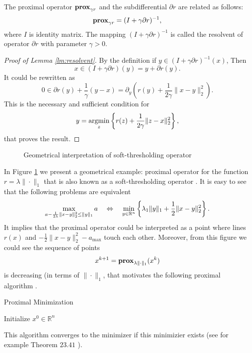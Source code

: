 {\begin{lemma}[Resolvent]\label{lm:resolvent}
    The proximal operator $\mathbf{prox}_{\gamma r}$ and the subdifferential $\partial r$ are related as follows:
    \begin{equation}\label{eq:resolvent}
        \mathbf{prox}_{\gamma r} = (I+\gamma\partial r)^{-1}, 
    \end{equation}
    where $I$ is identity matrix.
    The mapping $(I+\gamma\partial r)^{-1}$ is called the resolvent of operator $\partial r$ with parameter $\gamma>0$.
\end{lemma}
\begin{proof}[Proof of Lemma \ref{lm:resolvent}]
By the definition if $y\in (I+\gamma\partial r)^{-1}(x)$, Then
$$
x\in (I+\gamma\partial r)(y) = y + \partial r(y).
$$
It could be rewritten as
$$
0\in \partial r(y) + \frac{1}{\gamma}(y-x) = \partial_y \left(r(y) + \frac{1}{2\gamma}\|x-y\|_2^2\right).
$$
This is the necessary and sufficient condition for 
$$
y = \operatorname*{argmin}_z\left\{r(z) + \frac{1}{2\gamma}\|z-x\|_2^2\right\},
$$
that proves the result.
\end{proof}
}
\begin{figure}[H]
    \centering

    \caption{Geometrical interpretation of soft-thresholding operator}
    \label{fig:prox_l1}
\end{figure}

In Figure \ref{fig:prox_l1} we present a geometrical example: proximal operator for the function $r = \lambda\|\cdot\|_1$ that is also known as a soft-thresholding operator \cite{donoho1995noising}. It is easy to see that the following problems are equivalent 
$$
\max_{a - \frac{1}{2\lambda}\|x-y\|_2^2\leq\|y\|_1} a ~~~\Leftrightarrow~~~\min_{y\in\mathbb{R}^n}\left\{\lambda_1\|y\|_1 + \frac{1}{2}\|x-y\|_2^2\right\}.
$$
It implies that the proximal operator could be interpreted as a point where lines $r(x)$ and $-\frac{1}{2}\|x-y\|_2^2-a_{\max}$ touch each other. Moreover, from this figure we could see the sequence of points 
$$
x^{k+1} = \mathbf{prox}_{\lambda\|\cdot\|_1}(x^k)
$$
is decreasing (in terms of $\|\cdot\|_1$, that motivates the following proximal algorithm \cite{rockafellar1976monotone}.

\begin{algorithm}
    \caption{Proximal Minimization}
    \label{algo:pm}
    \begin{algorithmic}
        \STATE Initialize $x^0\in\mathbb{R}^n$
        \ENDFOR
    \end{algorithmic}
\end{algorithm}

This algorithm converges to the minimizer if this minimizier exists (see for example Theorem $23.41$ \cite{bauschke2011convex}).
